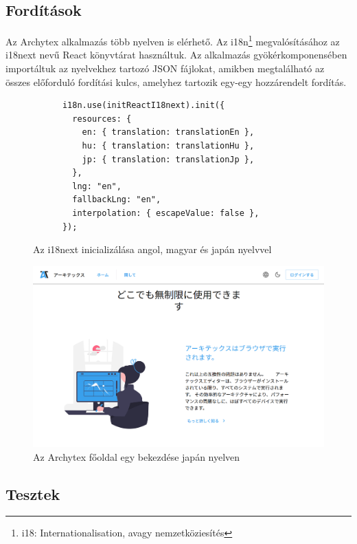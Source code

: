 \subsection{Fordítások}
Az Archytex alkalmazás több nyelven is elérhető. Az i18n\footnote{i18: Internationalisation, avagy nemzetköziesítés}  megvalósításához az i18next nevű React könyvtárat használtuk. Az alkalmazás gyökérkomponensében importáltuk az nyelvekhez tartozó JSON fájlokat, amikben megtalálható az összes előforduló fordítási kulcs, amelyhez tartozik egy-egy hozzárendelt fordítás.

\begin{figure}[h]
  \centering
  \begin{minipage}{.7\textwidth}
    \centering
    \begin{lstlisting}
      i18n.use(initReactI18next).init({
        resources: {
          en: { translation: translationEn },
          hu: { translation: translationHu },
          jp: { translation: translationJp },
        },
        lng: "en",
        fallbackLng: "en",
        interpolation: { escapeValue: false },
      });\end{lstlisting}
  \end{minipage}
  \caption{Az i18next inicializálása angol, magyar és japán nyelvvel}
\end{figure}

\begin{figure}[h]
  \centering
  \includegraphics[width=.6\textwidth]{parts/developer-documentation/frontend/images/translated.png}
  \caption{Az Archytex főoldal egy bekezdése japán nyelven}
\end{figure}

\subsection{Tesztek}
